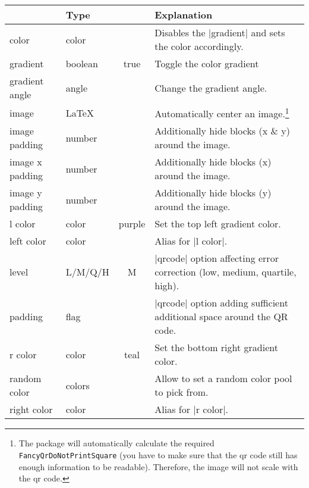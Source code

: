\documentclass[parskip=half,english,numbers=noenddot,footnotes=nomultiple,oneside]{scrartcl}
\def\ltx#1{\lstinline/#1/}
\begin{document}
\begin{savenotes}
\begin{table}
	\centering\begin{tabular}{>{\ttfamily}ll>{\ttfamily}cp{.5\linewidth}}
		\toprule
		\multicolumn{1}{l}{Option} & Type & \multicolumn{1}{c}{Default} & Explanation \\
		\midrule
		color           & color   &          & Disables the |gradient| and sets the color accordingly.      \\
		gradient        & boolean &   true   & Toggle the color gradient                                    \\
		gradient angle  & angle   &  135     & Change the gradient angle.                                   \\
		image           & \LaTeX   &          & Automatically center an image.\footnote{The package will automatically calculate the required \ltx{\\FancyQrDoNotPrintSquare} (you have to make sure that the qr code still has enough information to be readable). Therefore, the image will not scale with the qr code.} \\
		image padding   & number  &          & Additionally hide blocks (x \& y) around the image.          \\
		image x padding & number  &   0      & Additionally hide blocks (x) around the image.               \\
		image y padding & number  &   0      & Additionally hide blocks (y) around the image.               \\
		l color         & color   & purple   & Set the top left gradient color.                             \\
		left color      & color   &          & Alias for |l color|.                                         \\
		level 			 & L/M/Q/H &   M      & |qrcode| option affecting error correction (low, medium, quartile, high).                                     \\
		padding         & flag    &          & |qrcode| option adding sufficient additional space around the QR code.                                            \\
		r color         & color   &  teal    & Set the bottom right gradient color.                         \\
		random color    & colors  &          & Allow to set a random color pool to pick from.               \\
		right color     & color   &          & Alias for |r color|.                                         \\

\end{tabular}
\end{table}
\end{savenotes}
\end{document}
